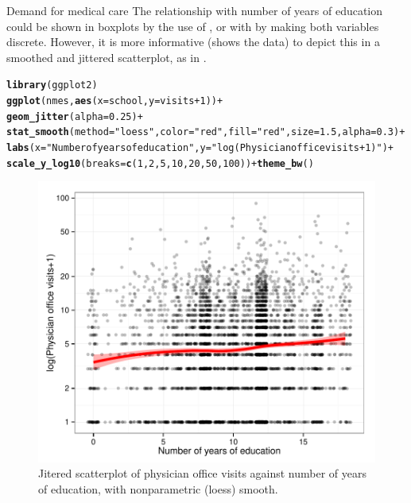 \documentclass[11pt]{book}\usepackage[]{graphicx}\usepackage[]{color}
\makeatletter
\newcommand{\hlnum}[1]{\textcolor[rgb]{0.686,0.059,0.569}{#1}}%
\newcommand{\hlstr}[1]{\textcolor[rgb]{0.192,0.494,0.8}{#1}}%
\newcommand{\hlopt}[1]{\textcolor[rgb]{0,0,0}{#1}}%
\newcommand{\hlstd}[1]{\textcolor[rgb]{0.345,0.345,0.345}{#1}}%
\newcommand{\hlkwc}[1]{\textcolor[rgb]{0.333,0.667,0.333}{#1}}%
\newcommand{\hlkwd}[1]{\textcolor[rgb]{0.737,0.353,0.396}{\textbf{#1}}}%
\newenvironment{kframe}{%
 \def\at@end@of@kframe{}%
 \ifinner\ifhmode%
  \def\at@end@of@kframe{\end{minipage}}%
  \begin{minipage}{\columnwidth}%
 \fi\fi%
 \def\FrameCommand##1{\hskip\@totalleftmargin \hskip-\fboxsep
 \colorbox{shadecolor}{##1}\hskip-\fboxsep
     \hskip-\linewidth \hskip-\@totalleftmargin \hskip\columnwidth}%
 \MakeFramed {\advance\hsize-\width
   \@totalleftmargin\z@ \linewidth\hsize
   \@setminipage}}%
 {\par\unskip\endMakeFramed%
 \at@end@of@kframe}
\newenvironment{knitrout}{}{} %
\renewenvironment{knitrout}{\small\renewcommand{\baselinestretch}{.85}}{} %
\makeatother
\begin{document}
\begin{Example}[nmes1]{Demand for medical care}
The relationship with number of years of education could be shown in boxplots by the use of
, or with  by making both variables discrete.
However, it is more informative (shows the data)
to depict this in a smoothed and jittered scatterplot,
as in .  
\begin{knitrout}
\color{fgcolor}\begin{kframe}
\begin{alltt}
\hlkwd{library}\hlstd{(ggplot2)}
\hlkwd{ggplot}\hlstd{(nmes,} \hlkwd{aes}\hlstd{(}\hlkwc{x}\hlstd{=school,} \hlkwc{y}\hlstd{=visits}\hlopt{+}\hlnum{1}\hlstd{))} \hlopt{+}
  \hlkwd{geom_jitter}\hlstd{(}\hlkwc{alpha}\hlstd{=}\hlnum{0.25}\hlstd{)} \hlopt{+}
  \hlkwd{stat_smooth}\hlstd{(}\hlkwc{method}\hlstd{=}\hlstr{"loess"}\hlstd{,} \hlkwc{color}\hlstd{=}\hlstr{"red"}\hlstd{,} \hlkwc{fill}\hlstd{=}\hlstr{"red"}\hlstd{,} \hlkwc{size}\hlstd{=}\hlnum{1.5}\hlstd{,} \hlkwc{alpha}\hlstd{=}\hlnum{0.3}\hlstd{)} \hlopt{+}
  \hlkwd{labs}\hlstd{(}\hlkwc{x}\hlstd{=}\hlstr{"Number of years of education"}\hlstd{,} \hlkwc{y}\hlstd{=}\hlstr{"log(Physician office visits+1)"}\hlstd{)} \hlopt{+}
  \hlkwd{scale_y_log10}\hlstd{(}\hlkwc{breaks}\hlstd{=}\hlkwd{c}\hlstd{(}\hlnum{1}\hlstd{,}\hlnum{2}\hlstd{,}\hlnum{5}\hlstd{,}\hlnum{10}\hlstd{,}\hlnum{20}\hlstd{,}\hlnum{50}\hlstd{,}\hlnum{100}\hlstd{))} \hlopt{+} \hlkwd{theme_bw}\hlstd{()}
\end{alltt}
\end{kframe}\begin{figure}[!htbp]


\centerline{\includegraphics[width=.6\textwidth]{ch09/fig/nmes-school} }

\caption[Jitered scatterplot of physician office visits against number of years of education, with nonparametric (loess) smooth]{Jitered scatterplot of physician office visits against number of years of education, with nonparametric (loess) smooth.\label{fig:nmes-school}}
\end{figure}



\end{knitrout}
\end{Example}
\end{document}
